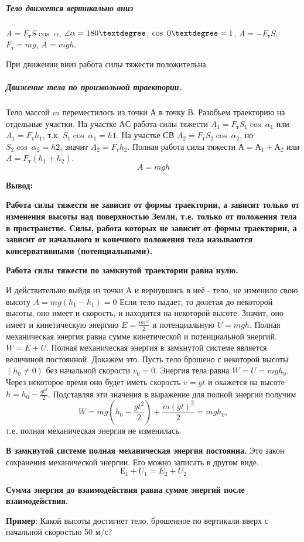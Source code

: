 \documentclass[a6paper, 11pt]{diss_4}
\renewcommand{\'}{\,'}
\begin{document}
\subparagraph*{Тело движется вертикально вниз} $A=F_тS\cos\ \alpha$, $\angle\alpha=180\textdegree$,  $\cos\ 0\textdegree = 1$, $A= -F_тS$,$ F_т=mg$,  $A=mgh$.

При движении вниз работа силы тяжести положительна.

\subparagraph*{Движение тела по произвольной траектории.} Тело массой $m$ переместилось из точки $А$ в точку $В$. Разобьем траекторию на отдельные участки. На участке $АС$ работа силы тяжести $A_1=F_тS_1\cos\ \alpha_1$  или $ A_1=F_тh_1$, т.к. $S_1\cos\ \alpha_1=h1$. На участке $СВ$ $A_2=F_тS_2\cos\ \alpha_2$, но $S_2\cos\ \alpha_2=h2$, значит $A_2=F_тh_2$. Полная  работа силы тяжести $А=А_1+А_2$ или $A=F_т(h_1+h_2)$.
\[
A=mgh
\]

\textbf{Вывод:}

\textbf{Работа силы тяжести не зависит от формы траектории, а зависит только от изменения  высоты над поверхностью Земли, т.е. только от положения тела в пространстве. Силы, работа которых не зависит от формы траектории, а зависит от начального и конечного положения тела называются консервативными (потенциальными).}

\textbf{Работа силы тяжести по замкнутой траектории  равна нулю.}

И действительно выйдя из точки $А$ и вернувшись в неё - тело, не изменило свою высоту  $A=mg(h_1-h_1)=0$
Если тело падает, то долетая до некоторой высоты, оно имеет и скорость, и находится на некоторой высоте. Значит, оно имеет и кинетическую энергию $E=\frac{mv^2}{2}$ и потенциальную $U=mgh$. Полная механическая энергия равна сумме кинетической и потенциальной энергий. $W = E+U$. Полная механическая энергия в замкнутой системе является величиной постоянной. Докажем это. Пусть тело брошено с некоторой высоты $(h_0\ne 0)$  без начальной скорости $v_0= 0$. Энергия тела равна $W = U = mgh_0$. Через некоторое время оно будет иметь скорость $v = gt$ и окажется на высоте $h=h_0-\frac{gt^2}{2}$.  Подставляя эти значения в выражение для полной энергии получим
\[
W=mg(h_0-\frac{gt^2}{2})+\frac{m(gt)^2}{2}=mgh_0,
\]
т.е. полная механическая энергия не изменилась.

\textbf{В замкнутой системе полная механическая энергия постоянна.} Это закон сохранения механической энергии. Его можно записать в другом виде.
\[
Е_1 + U_1 = E_2 + U_2
\]

\textbf{Сумма энергия до взаимодействия равна сумме энергий после взаимодействия.}

\textbf{Пример}: Какой высоты достигнет тело, брошенное по вертикали вверх с начальной скоростью 50 м/с?
\end{document}
